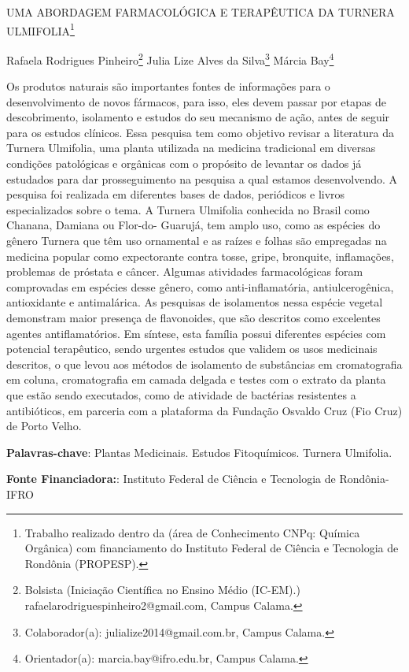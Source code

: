 \documentclass[article,12pt,onesidea,4paper,english,brazil]{abntex2}
\begin{document}
	
	
	\frenchspacing 
	
	\begin{center}
		\LARGE UMA ABORDAGEM FARMACOLÓGICA E TERAPÊUTICA DA TURNERA
		ULMIFOLIA\footnote{Trabalho realizado dentro da (área de Conhecimento CNPq:
			Química Orgânica) com financiamento do Instituto Federal de Ciência e Tecnologia de Rondônia
			(PROPESP).}
		
		\normalsize
	Rafaela Rodrigues Pinheiro\footnote{Bolsista (Iniciação Científica no Ensino Médio (IC-EM).) rafaelarodriguespinheiro2@gmail.com,
		Campus Calama.} 
	Julia Lize Alves da Silva\footnote{Colaborador(a): julialize2014@gmail.com.br, Campus Calama.} 
	Márcia Bay\footnote{Orientador(a): marcia.bay@ifro.edu.br, Campus Calama.} 
	\end{center}
	
	\noindent Os produtos naturais são importantes fontes de informações para o desenvolvimento
	de novos fármacos, para isso, eles devem passar por etapas de descobrimento,
	isolamento e estudos do seu mecanismo de ação, antes de seguir para os estudos
	clínicos. Essa pesquisa tem como objetivo revisar a literatura da Turnera Ulmifolia,
	uma planta utilizada na medicina tradicional em diversas condições patológicas e
	orgânicas com o propósito de levantar os dados já estudados para dar
	prosseguimento na pesquisa a qual estamos desenvolvendo. A pesquisa foi
	realizada em diferentes bases de dados, periódicos e livros especializados sobre o
	tema. A Turnera Ulmifolia conhecida no Brasil como Chanana, Damiana ou Flor-do-
	Guarujá, tem amplo uso, como as espécies do gênero Turnera que têm uso
	ornamental e as raízes e folhas são empregadas na medicina popular como
	expectorante contra tosse, gripe, bronquite, inflamações, problemas de próstata e
	câncer. Algumas atividades farmacológicas foram comprovadas em espécies desse
	gênero, como anti-inflamatória, antiulcerogênica, antioxidante e antimalárica. As
	pesquisas de isolamentos nessa espécie vegetal demonstram maior presença de
	flavonoides, que são descritos como excelentes agentes antiflamatórios. Em síntese,
	esta família possui diferentes espécies com potencial terapêutico, sendo urgentes
	estudos que validem os usos medicinais descritos, o que levou aos métodos de
	isolamento de substâncias em cromatografia em coluna, cromatografia em camada
	delgada e testes com o extrato da planta que estão sendo executados, como de
	atividade de bactérias resistentes a antibióticos, em parceria com a plataforma da
	Fundação Osvaldo Cruz (Fio Cruz) de Porto Velho.
	
	\vspace{\onelineskip}
	
	\noindent
	\textbf{Palavras-chave}: Plantas Medicinais. Estudos Fitoquímicos. Turnera Ulmifolia.
	
	\noindent
	\textbf{Fonte Financiadora:}: Instituto Federal de Ciência e Tecnologia de Rondônia-
	IFRO
	
\end{document}
